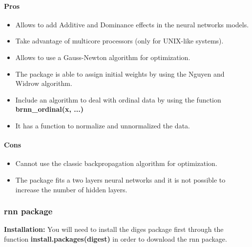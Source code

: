 \documentclass[letter]{article}\usepackage[]{graphicx}\usepackage[]{color}
\begin{document}
\paragraph{Pros}
\begin{itemize}
\item Allows to add Additive and Dominance effects in the neural networks models.
\item Take advantage of multicore processors (only for UNIX-like systems).
\item Allows to use a Gauss-Newton algorithm for optimization.
\item The package is able to assign initial weights by using the Nguyen and Widrow algorithm.
\item Include an algorithm to deal with ordinal data by using the function \textbf{brnn\_ordinal(x, ...)}
\item It has a function to normalize and unnormalized the data.
\end{itemize}
\paragraph{Cons}
\begin{itemize}
\item Cannot use the classic backpropagation algorithm for optimization.
\item The package fits a two layers neural networks and it is not possible to increase the number of hidden layers.
\end{itemize}

\subsubsection{rnn package}
\textbf{Installation:} You will need to install the diges package first through the function \textbf{install.packages(digest)} in order to download the rnn package.
\end{document}
